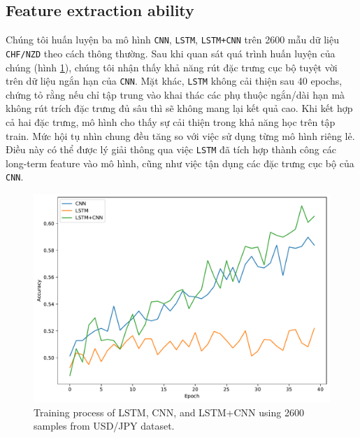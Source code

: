 \documentclass[aps,prb,groupedaddress,twocolumn,showpacs,dvipdfmx,superscriptaddress,pdftex]{revtex4-2}
\begin{document}
\subsection{Feature extraction ability}

Chúng tôi huấn luyện ba mô hình \verb|CNN|, \verb|LSTM|, \verb|LSTM+CNN| trên 2600 mẫu dữ liệu \verb|CHF/NZD| theo cách thông thường. Sau khi quan sát quá trình huấn luyện của chúng (hình \ref{fig:lstm_cnn}), chúng tôi nhận thấy khả năng rút đặc trưng cục bộ tuyệt vời trên dữ liệu ngắn hạn của \verb|CNN|. Mặt khác, \verb|LSTM| không cải thiện sau 40 epochs, chứng tỏ rằng nếu chỉ tập trung vào khai thác các phụ thuộc ngắn/dài hạn mà không rút trích đặc trưng đủ sâu thì sẽ không mang lại kết quả cao. Khi kết hợp cả hai đặc trưng, mô hình cho thấy sự cải thiện trong khả năng học trên tập train. Mức hội tụ nhìn chung đều tăng so với việc sử dụng từng mô hình riêng lẻ. Điều này có thể được lý giải thông qua việc \verb|LSTM| đã tích hợp thành công các long-term feature vào mô hình, cũng như việc tận dụng các đặc trưng cục bộ của \verb|CNN|.


\begin{figure}
    \centering
    \includegraphics[width=\linewidth]{img/models.pdf}
    \caption{Training process of LSTM, CNN, and LSTM+CNN using 2600 samples from USD/JPY dataset.}
    \label{fig:lstm_cnn}
\end{figure}
\end{document}
